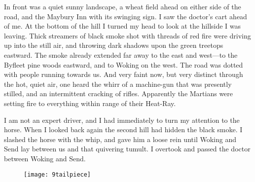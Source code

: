 In front was a quiet sunny landscape, a wheat field ahead on either side of the road, and the Maybury Inn with its swinging sign. I saw the doctor's cart ahead of me. At the bottom of the hill I turned my head to look at the hillside I was leaving. Thick streamers of black smoke shot with threads of red fire were driving up into the still air, and throwing dark shadows upon the green treetops eastward. The smoke already extended far away to the east and west—to the Byfleet pine woods eastward, and to Woking on the west. The road was dotted with people running towards us. And very faint now, but very distinct through the hot, quiet air, one heard the whirr of a machine-gun that was presently stilled, and an intermittent cracking of rifles. Apparently the Martians were setting fire to everything within range of their Heat-Ray.

I am not an expert driver, and I had immediately to turn my attention to the horse. When I looked back again the second hill had hidden the black smoke. I slashed the horse with the whip, and gave him a loose rein until Woking and Send lay between us and that quivering tumult. I overtook and passed the doctor between Woking and Send.

\begin{figure}[b!]
\centering
\texttt{[image: 9tailpiece]}
\end{figure}

